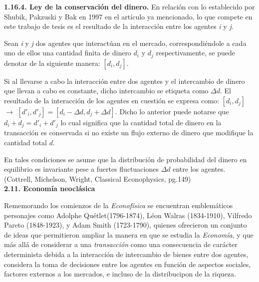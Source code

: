 {
\noindent
\Large  \textbf{1.16.4. Ley de la conservación del dinero.} 
}
\newline
En relación con lo establecido por Shubik, Pakzuski y Bak en 1997 en el artículo ya mencionado, lo que compete en este trabajo de tesis es el resultado de la interacción entre los agentes \textit{i} y \textit{j}. 

Sean \textit{i} y \textit{j} dos agentes que interactúan en el mercado, correspondiéndole a cada uno de ellos una cantidad finita de dinero $d_{i}$ y $d_{j}$ respectivamente, se puede denotar de la siguiente manera: $[d_{i},d_{j}]$. 

Si al llevarse a cabo la interacción entre dos agentes y el intercambio de dinero que llevan a cabo es constante, dicho intercambio se etiqueta como $\Delta d$. El resultado de la interacción de los agentes en cuestión se expresa como:  $[d_{i},d_{j}]$ $\longrightarrow$  $[d'_{i},d'_{j}] = [d_{i} - \Delta d ,d_{j} + \Delta d]$. Dicho lo anterior puede notarse que $d_{i} + d_{j} = d'_{i} + d'_{j}$ lo cual significa que la cantidad total de dinero en la transacción es conservada si no existe un flujo externo de dinero que modifique la cantidad total $d$.

En tales condiciones se asume que la distribución de probabilidad del dinero en equilibrio es invariante pese a fuertes fluctuaciones $\Delta d$ entre los agentes. (Cottrell, Michelson, Wright, Classical Econophysics, pg.149)
\newline
\\


{
\noindent
\Large  \textbf{2.11. Economía neoclásica} 
}

Rememorando los comienzos de la \textit{Econofísica} se encuentran emblemáticos personajes como Adolphe Quétlet(1796-1874), Léon Walras (1834-1910), Vilfredo Pareto (1848-1923), y Adam Smith (1723-1790), quienes ofrecieron un conjunto de ideas que permitieron ampliar la manera en que se estudia la \textit{Economía}, y que más allá de considerar a una \textit{transacción} como una consecuencia de carácter determinista debida a la interacción de intercambio de bienes entre dos agentes, considera la toma de decisiones entre los agentes en función de aspectos sociales, factores externos a los mercados, e incluso de la distribucipon de la riqueza.
\newline


